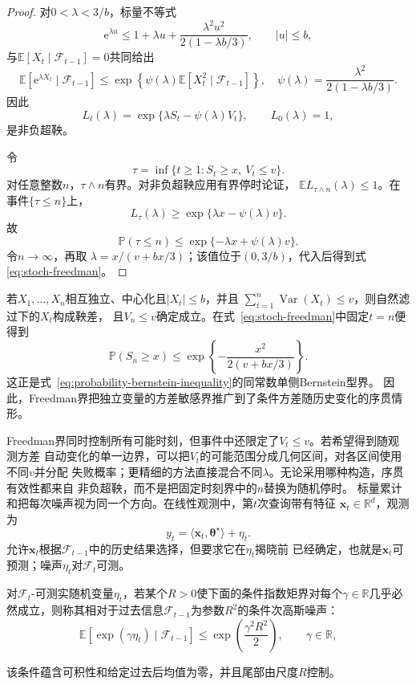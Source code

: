 \begin{proof}
对$0<\lambda<3/b$，标量不等式
\[
  \mathrm{e}^{\lambda u}
  \leq
  1+\lambda u+
  \frac{\lambda^2u^2}{2(1-\lambda b/3)},
  \qquad |u|\leq b,
  \]
与$\mathbb{E}[X_t\mid\mathcal{F}_{t-1}]=0$共同给出
\[
  \mathbb{E}[
    \mathrm{e}^{\lambda X_t}
    \mid\mathcal{F}_{t-1}]
  \leq
  \exp\left\{
    \psi(\lambda)
    \mathbb{E}[X_t^2\mid\mathcal{F}_{t-1}]
  \right\},
  \quad
  \psi(\lambda)=
  \frac{\lambda^2}{2(1-\lambda b/3)}.
\]
因此
\[
  L_t(\lambda)
  =
  \exp\{\lambda S_t-\psi(\lambda)V_t\},
  \qquad L_0(\lambda)=1,
\]
是非负超鞅。

令
\[
  \tau
  =
  \inf\{t\geq1:S_t\geq x,\ V_t\leq v\}.
  \]
对任意整数$n$，$\tau\wedge n$有界。对非负超鞅应用有界停时论证，
$\mathbb{E}L_{\tau\wedge n}(\lambda)\leq1$。在事件$\{\tau\leq n\}$上，
  \[
  L_\tau(\lambda)\geq\exp\{\lambda x-\psi(\lambda)v\}.
  \]
故
\[
  \mathbb{P}(\tau\leq n)\leq\exp\{-\lambda x+\psi(\lambda)v\}.
  \]
令$n\to\infty$，再取
$\lambda=x/(v+bx/3)$；该值位于$(0,3/b)$，代入后得到式
\eqref{eq:stoch-freedman}。
\end{proof}

若$X_1,\ldots,X_n$相互独立、中心化且$|X_t|\leq b$，并且
$\sum_{t=1}^{n}\operatorname{Var}(X_t)\leq v$，则自然滤过下的$X_t$构成鞅差，
且$V_n\leq v$确定成立。在式~\eqref{eq:stoch-freedman}中固定$t=n$便得到
\[
  \mathbb{P}(S_n\geq x)
  \leq
  \exp\left\{
    -\frac{x^2}{2(v+bx/3)}
  \right\}.
\]
这正是式~\eqref{eq:probability-bernstein-inequality}的同常数单侧Bernstein型界。
因此，Freedman界把独立变量的方差敏感界推广到了条件方差随历史变化的序贯情形。

Freedman界同时控制所有可能时刻，但事件中还限定了$V_t\leq v$。若希望得到随观测方差
自动变化的单一边界，可以把$V_t$的可能范围分成几何区间，对各区间使用不同$v$并分配
失败概率；更精细的方法直接混合不同$\lambda$。无论采用哪种构造，序贯有效性都来自
非负超鞅，而不是把固定时刻界中的$n$替换为随机停时。
标量累计和把每次噪声视为同一个方向。在线性观测中，第$t$次查询带有特征
$\bm{x}_t\in\mathbb{R}^d$，观测为
\begin{equation}
  y_t=\langle\bm{x}_t,\bm{\theta}^{\star}\rangle+\eta_t.
  \label{eq:stoch-adaptive-linear-observation}
\end{equation}
允许$\bm{x}_t$根据$\mathcal{F}_{t-1}$中的历史结果选择，但要求它在$\eta_t$揭晓前
已经确定，也就是$\bm{x}_t$可预测；噪声$\eta_t$对$\mathcal{F}_t$可测。
\begin{definition}[条件次高斯噪声]
  \label{def:stoch-conditional-subgaussian}
对\(\mathcal F_t\)-可测实随机变量\(\eta_t\)，若某个$R>0$使下面的条件指数矩界对每个\(\gamma\in\mathbb R\)几乎必然成立，则称其相对于过去信息\(\mathcal F_{t-1}\)为参数\(R^2\)的条件次高斯噪声：
\begin{equation}
  \mathbb{E}[
    \exp(\gamma\eta_t)
    \mid\mathcal{F}_{t-1}]
  \leq
  \exp\left(\frac{\gamma^2R^2}{2}\right),
  \qquad \gamma\in\mathbb{R},
  \label{eq:stoch-conditional-subgaussian}
\end{equation}
\end{definition}
该条件蕴含可积性和给定过去后均值为零，并且尾部由尺度$R$控制。

